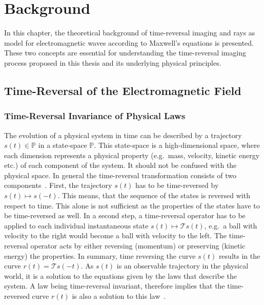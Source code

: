 
\chapter{Background}\label{chapter:background}
In this chapter, the theoretical background of time-reversal imaging and rays as model for electromagnetic waves according to Maxwell's equations is presented.
These two concepts are essential for understanding the time-reversal imaging process proposed in this thesis and its underlying physical principles. 

\section{Time-Reversal of the Electromagnetic Field}
\subsection{Time-Reversal Invariance of Physical Laws}
The evolution of a physical system in time can be described by a trajectory \(s(t) \in \mathbb{P}\) in a state-space \(\mathbb{P}\).
This state-space is a high-dimensional space, where each dimension represents a physical property (e.g.~mass, velocity, kinetic energy etc.) of each component of the system.
It should not be confused with the physical space.
In general the time-reversal transformation consists of two components~\parencite{roberts_reversing_2022}.
First, the trajectory \(s(t)\) has to be time-reversed by \(s(t) \mapsto s(-t)\).
This means, that the sequence of the states is reversed with respect to time.
This alone is not sufficient as the properties of the states have to be time-reversed as well.
In a second step, a time-reversal operator has to be applied to each individual instantaneous state \(s(t) \mapsto \mathcal{T}s(t)\), e.g.\ a ball with velocity to the right would become a ball with velocity to the left.
The time-reversal operator acts by either reversing (momentum) or preserving (kinetic energy) the properties.
In summary, time reversing the curve \(s(t)\) results in the curve \(r(t)=\mathcal{T}s(-t)\). 
As \(s(t)\) is an observable trajectory in the physical world, it is a solution to the equations given by the laws that describe the system. 
A law being time-reversal invariant, therefore implies that the time-reversed curve \(r(t)\) is also a solution to this law~\parencite{roberts_time_2021}.

